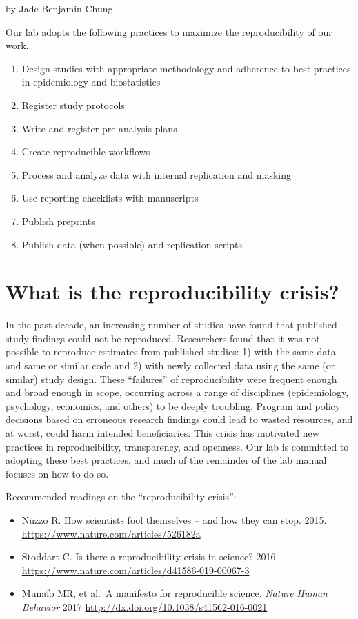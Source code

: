 \documentclass[
]{book}
\providecommand{\tightlist}{%
  \setlength{\itemsep}{0pt}\setlength{\parskip}{0pt}}
\begin{document}
by Jade Benjamin-Chung

Our lab adopts the following practices to maximize the reproducibility of our work.

\begin{enumerate}
\def\labelenumi{\arabic{enumi}.}
\tightlist
\item
  Design studies with appropriate methodology and adherence to best practices in epidemiology and biostatistics
\item
  Register study protocols
\item
  Write and register pre-analysis plans
\item
  Create reproducible workflows
\item
  Process and analyze data with internal replication and masking
\item
  Use reporting checklists with manuscripts
\item
  Publish preprints
\item
  Publish data (when possible) and replication scripts
\end{enumerate}

\section{What is the reproducibility crisis?}\label{what-is-the-reproducibility-crisis}

In the past decade, an increasing number of studies have found that published study findings could not be reproduced. Researchers found that it was not possible to reproduce estimates from published studies: 1) with the same data and same or similar code and 2) with newly collected data using the same (or similar) study design. These ``failures'' of reproducibility were frequent enough and broad enough in scope, occurring across a range of disciplines (epidemiology, psychology, economics, and others) to be deeply troubling. Program and policy decisions based on erroneous research findings could lead to wasted resources, and at worst, could harm intended beneficiaries. This crisis has motivated new practices in reproducibility, transparency, and openness. Our lab is committed to adopting these best practices, and much of the remainder of the lab manual focuses on how to do so.

Recommended readings on the ``reproducibility crisis'':

\begin{itemize}
\item
  Nuzzo R. How scientists fool themselves -- and how they can stop. 2015. \href{}{https://www.nature.com/articles/526182a}
\item
  Stoddart C. Is there a reproducibility crisis in science? 2016. \url{https://www.nature.com/articles/d41586-019-00067-3}
\item
  Munafo MR, et al.~A manifesto for reproducible science. \emph{Nature Human Behavior} 2017 \url{http://dx.doi.org/10.1038/s41562-016-0021}
\end{itemize}
\end{document}

